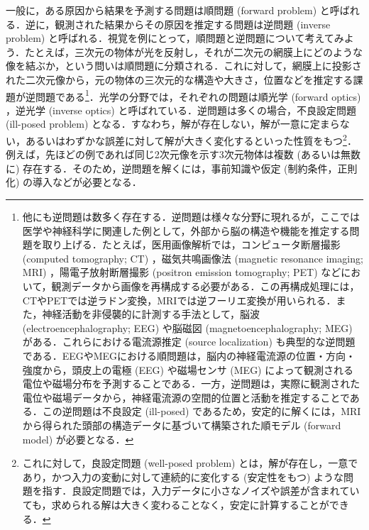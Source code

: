 \documentclass[titlepage]{ltjsbook}
\begin{document}
一般に，ある原因から結果を予測する問題は順問題 (forward problem) と呼ばれる．逆に，観測された結果からその原因を推定する問題は逆問題 (inverse problem) と呼ばれる．視覚を例にとって，順問題と逆問題について考えてみよう．たとえば，三次元の物体が光を反射し，それが二次元の網膜上にどのような像を結ぶか，という問いは順問題に分類される．これに対して，網膜上に投影された二次元像から，元の物体の三次元的な構造や大きさ，位置などを推定する課題が逆問題である\footnote{他にも逆問題は数多く存在する．逆問題は様々な分野に現れるが，ここでは医学や神経科学に関連した例として，外部から脳の構造や機能を推定する問題を取り上げる．たとえば，医用画像解析では，コンピュータ断層撮影 (computed tomography; CT) ，磁気共鳴画像法 (magnetic resonance imaging; MRI) ，陽電子放射断層撮影 (positron emission tomography; PET) などにおいて，観測データから画像を再構成する必要がある．この再構成処理には，CTやPETでは逆ラドン変換，MRIでは逆フーリエ変換が用いられる．また，神経活動を非侵襲的に計測する手法として，脳波 (electroencephalography; EEG) や脳磁図 (magnetoencephalography; MEG) がある．これらにおける電流源推定 (source localization) も典型的な逆問題である．EEGやMEGにおける順問題は，脳内の神経電流源の位置・方向・強度から，頭皮上の電極 (EEG) や磁場センサ (MEG) によって観測される電位や磁場分布を予測することである．一方，逆問題は，実際に観測された電位や磁場データから，神経電流源の空間的位置と活動を推定することである．この逆問題は不良設定 (ill-posed) であるため，安定的に解くには，MRIから得られた頭部の構造データに基づいて構築された順モデル (forward model) が必要となる．}．光学の分野では，それぞれの問題は順光学 (forward optics) ，逆光学 (inverse optics) と呼ばれている．逆問題は多くの場合，不良設定問題 (ill-posed problem) となる．すなわち，解が存在しない，解が一意に定まらない，あるいはわずかな誤差に対して解が大きく変化するといった性質をもつ\footnote{これに対して，良設定問題 (well-posed problem) とは，解が存在し，一意であり，かつ入力の変動に対して連続的に変化する (安定性をもつ) ような問題を指す．良設定問題では，入力データに小さなノイズや誤差が含まれていても，求められる解は大きく変わることなく，安定に計算することができる．}．例えば，先ほどの例であれば同じ2次元像を示す3次元物体は複数 (あるいは無数に) 存在する．そのため，逆問題を解くには，事前知識や仮定 (制約条件，正則化) の導入などが必要となる．
\end{document}
